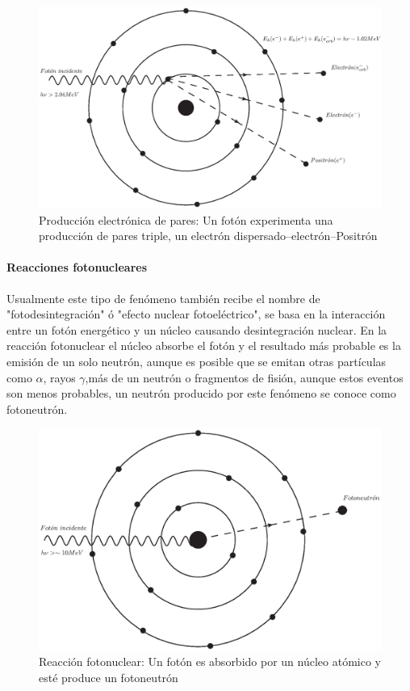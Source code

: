 \begin{figure}[htbp]
    \centering
    \includegraphics[width=.71\linewidth]{./Figures/electpp.eps}
    \caption[Producción electrónica de pares]{Producción electrónica de pares: Un fotón experimenta una producción de pares triple, un electrón dispersado--electrón--Positrón}
    \label{fig:PE}
\end{figure}

\paragraph{Reacciones fotonucleares}
 Usualmente este tipo de fenómeno también recibe el nombre de "fotodesintegración" ó "efecto nuclear fotoeléctrico", se basa en la interacción entre un fotón energético y un núcleo causando desintegración nuclear. En la reacción fotonuclear el núcleo absorbe el fotón y el resultado más probable es la emisión de un solo neutrón, aunque es posible que se emitan otras partículas como $\alpha$, rayos $\gamma$,más de un neutrón o fragmentos de fisión, aunque estos eventos son menos probables, un neutrón producido por este fenómeno se conoce como fotoneutrón\cite{Podgorsak}.

 \begin{figure}[htbp]
     \centering
     \includegraphics[width=.71\linewidth]{./Figures/fotoneu.eps}
     \caption[Reacción fotonuclear]{Reacción fotonuclear: Un fotón es absorbido por un núcleo atómico y esté produce un fotoneutrón}
     \label{fig:RF}
 \end{figure}


